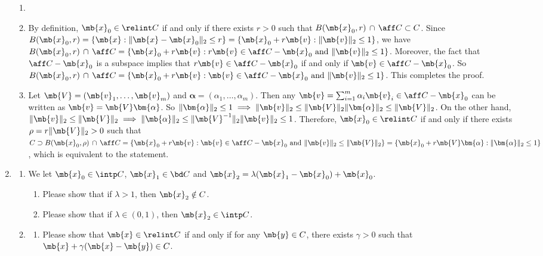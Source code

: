 \begin{exercise}
\begin{enumerate}
\begin{enumerate}
      \end{enumerate}
      \begin{solution}
        \begin{enumerate}
          \item []
          \item By definition, $\mb{x}_0\in\relint C$ if and only if there exists $r>0$ such that $B(\mb{x}_0, r)\,\cap\,\aff C \subset C$. Since $B(\mb{x}_0, r) = \{\mb{x} : \|\mb{x}-\mb{x}_0\|_2\le r\} = \{\mb{x}_0 + r\mb{v} : \|\mb{v}\|_2\le 1\}$, we have $B(\mb{x}_0, r)\,\cap\,\aff C = \{\mb{x}_0 + r\mb{v} : r\mb{v}\in\aff C-\mb{x}_0\ \text{and}\ \|\mb{v}\|_2\le 1\}$. Moreover, the fact that $\aff C-\mb{x}_0$ is a subspace implies that $r\mb{v}\in\aff C-\mb{x}_0$ if and only if $\mb{v}\in\aff C-\mb{x}_0$. So $B(\mb{x}_0, r)\,\cap\,\aff C = \{\mb{x}_0 + r\mb{v} : \mb{v}\in\aff C-\mb{x}_0\ \text{and}\ \|\mb{v}\|_2\le 1\}$. This completes the proof.
          \item Let $\mb{V} = (\mb{v}_1, \ldots, \mb{v}_m)$ and $\bm{\alpha} = (\alpha_1, \ldots, \alpha_m)$. Then any $\mb{v} = \sum_{i=1}^m \alpha_i \mb{v}_i \in \aff C -\mb{x}_0$ can be written as $\mb{v} = \mb{V}\bm{\alpha}$. So $\|\bm{\alpha}\|_2\le 1 \implies \|\mb{v}\|_2 \le \|\mb{V}\|_2\|\bm{\alpha}\|_2 \le \|\mb{V}\|_2$. On the other hand, $\|\mb{v}\|_2\le \|\mb{V}\|_2 \implies \|\mb{\alpha}\|_2 \le \|\mb{V}^{-1}\|_2\|\mb{v}\|_2 \le 1$. Therefore, $\mb{x}_0\in\relint C$ if and only if there exists $\rho = r\|\mb{V}\|_2 > 0$ such that $C \supset B(\mb{x}_0, \rho)\,\cap\,\aff C = \{\mb{x}_0 + r\mb{v} : \mb{v}\in\aff C-\mb{x}_0\ \text{and}\ \|\mb{v}\|_2\le \|\mb{V}\|_2\} = \{\mb{x}_0 + r\mb{V}\bm{\alpha} : \|\bm{\alpha}\|_2\le 1\}$, which is equivalent to the statement. \qedhere
            \qedhere
        \end{enumerate}
      \end{solution}
    \item
      \begin{enumerate}
        \item  We let $\mb{x}_0\in \intp C$, $\mb{x}_1\in\bd C$ and $\mb{x}_2=\lambda (\mb{x}_1-\mb{x}_0)+\mb{x}_0$.
          \begin{enumerate}
            \item Please show that if $\lambda>1$, then $\mb{x}_2\notin C$.
            \item Please show that if $\lambda\in(0,1)$, then $\mb{x}_2\in\intp C$.
          \end{enumerate}
        \item
          \begin{enumerate}
            \item Please show that $\mb{x} \in \relint C$ if and only if for any $\mb{y}\in C$, there exists $\gamma>0$ such that $\mb{x}+\gamma(\mb{x}-\mb{y}) \in C$.


\end{enumerate}
\end{enumerate}
\end{enumerate}
\end{exercise}
